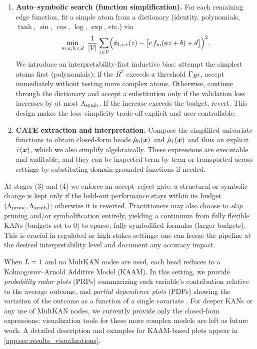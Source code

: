 \begin{enumerate}
    \item \textbf{Auto–symbolic search (function simplification).} For each remaining edge function, fit a simple atom from a dictionary (identity, polynomials, $\tanh$, $\sin$, $\cos$, $\log$, $\exp$, etc.) via
    \begin{equation}
    \min_{m,a,b,c,d}\ \frac{1}{|\mathcal{V}|}\sum_{\samplekan\in\mathcal{V}}\!\Big(\kanlayer_{\indexlayer,\indexsix,\indexfive}(\samplekan)-\big[c\,f_m(a\samplekan+b)+d\big]\Big)^2.
    \end{equation}
    We introduce an interpretability-first inductive bias: attempt the simplest atoms first (polynomials); if the $R^2$ exceeds a threshold $\Gamma_{R^2}$, accept immediately without testing more complex atoms. Otherwise, continue through the dictionary and accept a substitution only if the validation loss increases by at most $\Lambda_\text{symb}$. If the increase exceeds the budget, revert. This design makes the loss–simplicity trade-off explicit and user-controllable.

    \item \textbf{CATE extraction and interpretation.} Compose the simplified univariate functions to obtain closed-form heads $\hat{\mu}_0({\bm{x}})$ and $\hat{\mu}_1({\bm{x}})$ and thus an explicit $\hat{\tau}({\bm{x}})$, which we also simplify algebraically. These expressions are executable and auditable, and they can be inspected term by term or transported across settings by substituting domain-grounded functions if needed.
\end{enumerate}

At stages (3) and (4) we enforce an accept–reject gate: a structural or symbolic change is kept only if the held-out performance stays within its budget $(\Lambda_\text{prune},\Lambda_\text{symb})$; otherwise it is reverted. Practitioners may also choose to \emph{skip} pruning and/or symbolification entirely, yielding a continuum from fully flexible KANs (budgets set to $0$) to sparse, fully symbolified formulas (larger budgets). This is crucial in regulated or high-stakes settings: one can freeze the pipeline at the desired interpretability level and document any accuracy impact.

When $L=1$ and no MultKAN nodes are used, each head reduces to a Kolmogorov--Arnold Additive Model (KAAM). In this setting, we provide \itemi \emph{probability radar plots} (PRPs) summarizing each variable’s contribution relative to the average outcome, and \itemii \emph{partial dependence plots} (PDPs) showing the variation of the outcome as a function of a single covariate \citep{knottenbelt2024coxkan,pati25kaam}. For deeper KANs or any use of MultKAN nodes, we currently provide only the closed-form expressions; visualization tools for these more complex models are left as future work. A detailed description and examples for KAAM-based plots appear in \cref{app:sec:results_visualizations}.

